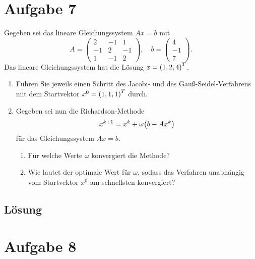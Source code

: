 \documentclass{exercise}
\begin{document}
    \section*{Aufgabe 7}
    
    \begin{problem}
        Gegeben sei das lineare Gleichungssystem \(Ax = b\) mit
        \[
            A = \begin{pmatrix}
                2 & -1 & 1\\
                -1 & 2 & -1\\
                1 & -1 & 2
            \end{pmatrix}, \quad b = \begin{pmatrix}
                4\\
                -1\\
                7
            \end{pmatrix}.
        \]
        Das lineare Gleichungssystem hat die Lösung \(x = \parentheses*{1, 2, 4}^T\).
        \begin{enumerate}
            \item Führen Sie jeweils einen Schritt des Jacobi- und des Gauß-Seidel-Verfahrens mit dem Startvektor \(x^0 = \parentheses*{1, 1, 1}^T\) durch.
            \item Gegeben sei nun die Richardson-Methode
            \[
                x^{k + 1} = x^k + \omega\parentheses*{b - Ax^k}
            \]
            für das Gleichungssystem \(Ax = b\).
            \begin{enumerate}
                \item Für welche Werte \(\omega\) konvergiert die Methode?
                \item Wie lautet der optimale Wert für \(\omega\), sodass das Verfahren unabhängig vom Startvektor \(x^0\) am schnellsten konvergiert?
            \end{enumerate}
        \end{enumerate}
    \end{problem}
    
    \subsection*{Lösung}


    \section*{Aufgabe 8}
    
\end{document}

